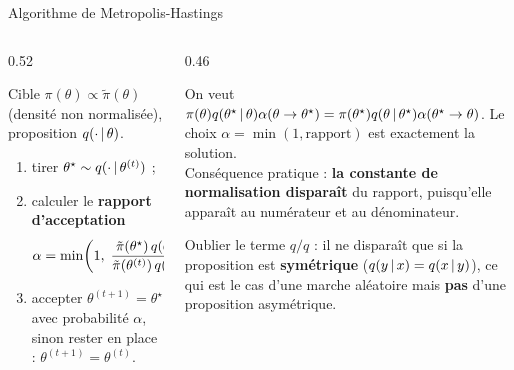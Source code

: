 \begin{frame}{Algorithme de Metropolis-Hastings}
\footnotesize
\begin{columns}[t]
\begin{column}{0.52\textwidth}
\begin{ebox}[Algorithme]
Cible $\pi(\theta) \propto \tilde\pi(\theta)$ (densité non normalisée),
proposition $q(\cdot \,\vert\, \theta)$.
\begin{enumerate}
  \item tirer $\theta^\star \sim q(\cdot \,\vert\, \theta^{(t)})$ ;
  \item calculer le \textbf{rapport d'acceptation}
\[
\alpha = \min\!\left(1,\;
\frac{\tilde\pi(\theta^\star)\,q(\theta^{(t)} \,\vert\, \theta^\star)}
{\tilde\pi(\theta^{(t)})\,q(\theta^\star \,\vert\, \theta^{(t)})}\right) ;
\]
  \item accepter $\theta^{(t+1)} = \theta^\star$ avec probabilité $\alpha$,
        sinon rester en place : $\theta^{(t+1)} = \theta^{(t)}$.
\end{enumerate}
\end{ebox}
\end{column}
\begin{column}{0.46\textwidth}
\begin{kbox}
On veut $\pi(\theta) q(\theta^\star \,\vert\, \theta)\alpha(\theta \to \theta^\star)
= \pi(\theta^\star) q(\theta \,\vert\, \theta^\star)\alpha(\theta^\star \to \theta)$.
Le choix $\alpha = \min(1, \text{rapport})$ est exactement la solution.
\\[1mm]
Conséquence pratique : \textbf{la constante de normalisation disparaît} du
rapport, puisqu'elle apparaît au numérateur et au dénominateur.
\end{kbox}
\begin{wbox}
Oublier le terme $q/q$ : il ne dispara\^it que si la proposition est
\textbf{symétrique} ($q(y \,\vert\, x) = q(x \,\vert\, y)$), ce qui est le cas d'une
marche aléatoire mais \textbf{pas} d'une proposition asymétrique.
\end{wbox}
\end{column}
\end{columns}
\end{frame}


